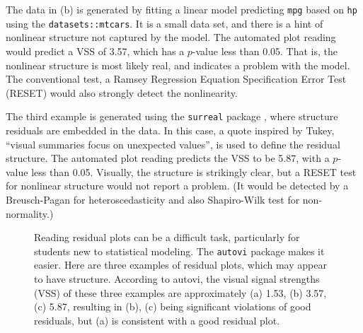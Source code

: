 \documentclass[
doublespace,
  times]{anzsauth}
\begin{document}
The data in (b) is generated by fitting a linear model predicting
\texttt{mpg} based on \texttt{hp} using the \texttt{datasets::mtcars}.
It is a small data set, and there is a hint of nonlinear structure not
captured by the model. The automated plot reading would predict a VSS of
3.57, which has a \(p\)-value less than 0.05. That is, the nonlinear
structure is most likely real, and indicates a problem with the model.
The conventional test, a Ramsey Regression Equation Specification Error
Test (RESET) \citep{ramsey1969tests} would also strongly detect the
nonlinearity.

The third example is generated using the \texttt{surreal} package
\citep{surreal}, where structure residuals are embedded in the data. In
this case, a quote inspired by Tukey, ``visual summaries focus on
unexpected values'', is used to define the residual structure. The
automated plot reading predicts the VSS to be 5.87, with a \(p\)-value
less than 0.05. Visually, the structure is strikingly clear, but a RESET
test for nonlinear structure would not report a problem. (It would be
detected by a Breusch-Pagan for heteroscedasticity and also Shapiro-Wilk
test \citep{shapiro1965analysis} for non-normality.)

\begin{figure}


\caption{\label{fig-three-examples}Reading residual plots can be a
difficult task, particularly for students new to statistical modeling.
The \texttt{autovi} package makes it easier. Here are three examples of
residual plots, which may appear to have structure. According to autovi,
the visual signal strengths (VSS) of these three examples are
approximately (a) 1.53, (b) 3.57, (c) 5.87, resulting in (b), (c) being
significant violations of good residuals, but (a) is consistent with a
good residual plot.}

\end{figure}%
\end{document}
